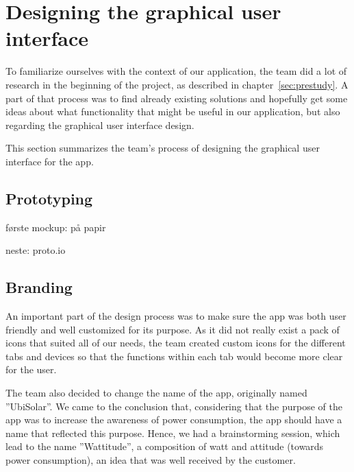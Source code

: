 \section{Designing the graphical user interface}
To familiarize ourselves with the context of our application, the team did a lot of research in the beginning of the project, as described in chapter~\ref{sec:prestudy}. A part of that process was to find already existing solutions and hopefully get some ideas about what functionality that might be useful in our application, but also regarding the graphical user interface design.

This section summarizes the team's process of designing the graphical user interface for the app.



\subsection{Prototyping}
første mockup:
på papir

neste:
proto.io

\subsection{Branding}
An important part of the design process was to make sure the app was both user friendly and well customized for its purpose. As it did not really exist a pack of icons that suited all of our needs, the team created custom icons for the different tabs and devices so that the functions within each tab would become more clear for the user.

The team also decided to change the name of the app, originally named ''UbiSolar''. We came to the conclusion that, considering that the purpose of the app was to increase the awareness of power consumption, the app should have a name that reflected this purpose. Hence, we had a brainstorming session, which lead to the name ''Wattitude'', a composition of watt and attitude (towards power consumption), an idea that was well received by the customer.